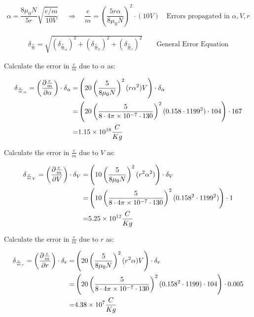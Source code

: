 \documentclass[12pt]{article}
\newcommand{\paren}[1]{\left( {#1} \right)}
\begin{document}
\begin{equation}
	\alpha = \frac{8\mu_0N}{5r}\sqrt{\frac{e/m}{10V}}\
	\quad \Rightarrow \quad
	\frac{e}{m}=\paren{\frac{5r\alpha}{8\mu_0N}}^2\cdot(10V)
	\quad \text{Errors propagated in }\alpha, V, r 
	\label{e:em_derive_FixV}
\end{equation}

\begin{align}
	\delta_\frac{e}{m}=\sqrt{\paren{\delta_{\frac{e}{m}_\alpha}}^2+\paren{\delta_{\frac{e}{m}_V}}^2+\paren{\delta_{\frac{e}{m}_r}}^2} \qquad \text{General Error Equation} \label{e:FixV_err}
\end{align}

Calculate the error in $\frac{e}{m}$ due to $\alpha$ as:

\begin{align}
	\delta_{\frac{e}{m}_\alpha} = \paren{\frac{\partial \frac{e}{m}}{\partial \alpha}}\cdot\delta_\alpha =& \paren{20\paren{\frac{5}{8\mu_0N}}^2(r\alpha^2)V}\cdot\delta_\alpha \label{e:FixV_err_alpha} \\
	=& \paren{20\paren{\frac{5}{8\cdot4\pi\times10^{-7}\cdot130}}^2(0.158\cdot1199^2)\cdot104}\cdot167 \notag \\
	=& 1.15\times10^{18} \frac{C}{Kg} \notag
\end{align}

Calculate the error in $\frac{e}{m}$ due to $V$ as:

\begin{align}
	\delta_{\frac{e}{m}_V} = \paren{\frac{\partial \frac{e}{m}}{\partial V}}\cdot\delta_V =& \paren{10\paren{\frac{5}{8\mu_0N}}^2(r^2\alpha^2)}\cdot \delta_V \label{e:FixV_err_V} \\
	=& \paren{10\paren{\frac{5}{8\cdot4\pi\times10^{-7}\cdot130}}^2(0.158^2\cdot1199^2)}\cdot1 \notag \\
	=& 5.25\times10^{12} \frac{C}{Kg} \notag
\end{align}

Calculate the error in $\frac{e}{m}$ due to $r$ as:

\begin{align}
	\delta_{\frac{e}{m}_r} = \paren{\frac{\partial \frac{e}{m}}{\partial r}}\cdot\delta_r =& \paren{20\paren{\frac{5}{8\mu_0N}}^2(r^2\alpha)V}\cdot \delta_r \label{e:Fix_err_r} \\
	=& \paren{20\paren{\frac{5}{8\cdot4\pi\times10^{-7}\cdot130}}^2(0.158^2\cdot1199)\cdot104}\cdot0.005 \notag \\
	=& 4.38\times10^7 \frac{C}{Kg} \notag
\end{align}
\end{document}

